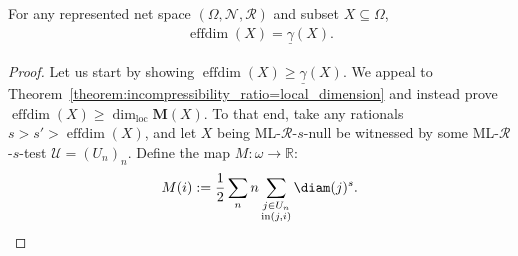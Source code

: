 \begin{theorem}
    \label{theorem:effdim_H=incompressibility_ratio}
    For any represented net space $(\Omega, \mathcal{N}, \mathscr{R})$ and subset $X \subseteq \Omega$, 
    \begin{align*}
        \operatorname{effdim}(X) = \underline{\gamma}(X).
    \end{align*}
\end{theorem}
\begin{proof}
    Let us start by showing $\operatorname{effdim}(X) \geq \underline{\gamma}(X)$. We appeal to Theorem~\ref{theorem:incompressibility_ratio=local_dimension} and instead prove $\operatorname{effdim}(X) \geq \dim_{\operatorname{loc}} \mathbf{M}(X)$. To that end, take any rationals $s > s' > \operatorname{effdim}(X)$, and let $X$ being ML-$\mathscr{R}$-$s$-null be witnessed by some ML-$\mathscr{R}$-$s$-test $\mathcal{U} = (U_n)_n$. Define the map $M: \omega \to \mathbb{R}$:
    \begin{align*}
        M(i) := \frac{1}{2} \sum_n n \sum_{\substack{j \in U_n \\ \operatorname{in}(j, i)}} \diam(j)^s. 
    \end{align*}
    

\end{proof}
